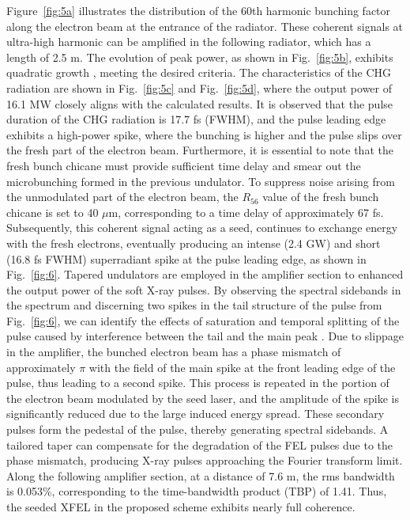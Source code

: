 \documentclass[%
 reprint,
 amsmath,amssymb,
 aps,
]{revtex4-2}
\begin{document}
Figure~\ref{fig:5a} illustrates the distribution of the 60th harmonic bunching factor along the electron beam at the entrance of the radiator. These coherent signals at ultra-high harmonic can be amplified in the following radiator, which has a length of 2.5 m. The evolution of peak power, as shown in Fig.~\ref{fig:5b}, exhibits quadratic growth \citep{Giannessi2005, Yang2020}, meeting the desired criteria. The characteristics of the CHG radiation are shown in Fig.~\ref{fig:5c} and Fig.~\ref{fig:5d}, where the output power of 16.1 MW closely aligns with the calculated results. It is observed that the pulse duration of the CHG radiation is 17.7 fs (FWHM), and the pulse leading edge exhibits a high-power spike, where the bunching is higher and the pulse slips over the fresh part of the electron beam. Furthermore, it is essential to note that the fresh bunch chicane must provide sufficient time delay and smear out the microbunching formed in the previous undulator. To suppress noise arising from the unmodulated part of the electron beam, the $R_{56}$ value of the fresh bunch chicane is set to 40 $\mu$m, corresponding to a time delay of approximately 67 fs. Subsequently, this coherent signal acting as a seed, continues to exchange energy with the fresh electrons, eventually producing an intense (2.4 GW) and short (16.8 fs FWHM) superradiant spike at the pulse leading edge, as shown in Fig.~\ref{fig:6}. Tapered undulators are employed in the amplifier section to enhanced the output power of the soft X-ray pulses. By observing the spectral sidebands in the spectrum and discerning two spikes in the tail structure of the pulse from Fig.~\ref{fig:6}, we can identify the effects of saturation and temporal splitting of the pulse caused by interference between the tail and the main peak \cite{Labat2009, Mirian2021, Yang2020}. Due to slippage in the amplifier, the bunched electron beam has a phase mismatch of approximately $\pi$ with the field of the main spike at the front leading edge of the pulse, thus leading to a second spike. This process is repeated in the portion of the electron beam modulated by the seed laser, and the amplitude of the spike is significantly reduced due to the large induced energy spread. These secondary pulses form the pedestal of the pulse, thereby generating spectral sidebands. A tailored taper can compensate for the degradation of the FEL pulses due to the phase mismatch, producing X-ray pulses approaching the Fourier transform limit. Along the following amplifier section, at a distance of 7.6 m, the rms bandwidth is 0.053\%, corresponding to the time-bandwidth product (TBP) of 1.41. Thus, the seeded XFEL in the proposed scheme exhibits nearly full coherence.
\end{document}
